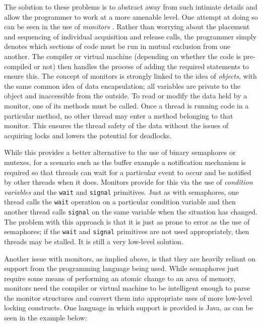 The solution to these problems is to abstract away from such intimate
details and allow the programmer to work at a more amenable level.
One attempt at doing so can be seen in the use of \emph{monitors}
\cite{mon1, mon2}.  Rather than worrying about the placement and
sequencing of individual acquisition and release calls, the programmer
simply denotes which sections of code must be run in mutual exclusion
from one another.  The compiler or virtual machine (depending on
whether the code is pre-compiled or not) then handles the process of
adding the required statements to ensure this.  The concept of
monitors is strongly linked to the idea of \emph{objects}, with the
same common idea of data encapsulation; all variables are private to
the object and inaccessible from the outside.  To read or modify the
data held by a monitor, one of its methods must be called.  Once a
thread is running code in a particular method, no other thread may
enter a method belonging to that monitor.  This ensures the thread
safety of the data without the issues of acquiring locks and lowers
the potential for deadlocks.

While this provides a better alternative to the use of binary
semaphores or mutexes, for a scenario such as the buffer example a
notification mechanism is required so that threads can wait for a
particular event to occur and be notified by other threads when it
does.  Monitors provide for this via the use of \emph{condition
  variables} and the \texttt{wait} and \texttt{signal} primitives.
Just as with semaphores, one thread calls the \texttt{wait} operation
on a particular condition variable and then another thread calls
\texttt{signal} on the same variable when the situation has changed.
The problem with this approach is that it is just as prone to error as
the use of semaphores; if the \texttt{wait} and \texttt{signal}
primitives are not used appropriately, then threads may be stalled.
It is still a very low-level solution.

Another issue with monitors, as implied above, is that they are
heavily reliant on support from the programming language being used.
While semaphores just require some means of performing an atomic
change to an area of memory, monitors need the compiler or virtual
machine to be intelligent enough to parse the monitor structures and
convert them into appropriate uses of more low-level locking
constructs.  One language in which support is provided is Java, as can
be seen in the example below:

